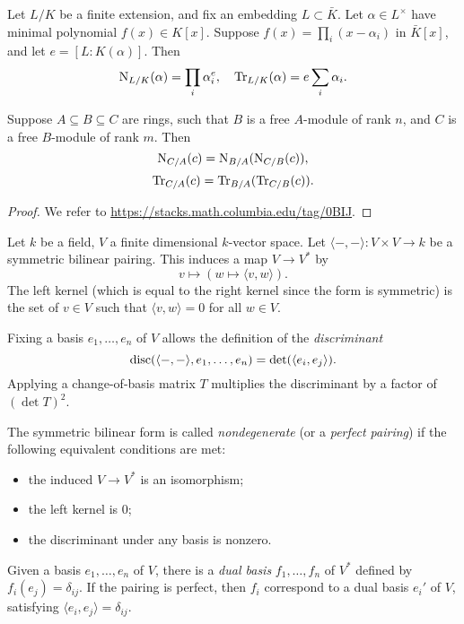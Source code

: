 \documentclass[11pt]{amsart}
\begin{document}
\begin{prop}
Let $L/K$ be a finite extension, and fix an embedding $L\subset \bar{K}$. Let $\alpha\in L^{\times}$ have minimal polynomial $f(x)\in K[x]$. Suppose $f(x) = \prod_i (x-\alpha_i)$ in $\bar{K}[x]$, and let $e = [L:K(\alpha)]$. Then
\[\operatorname{N}_{L/K}(\alpha) = \prod_i \alpha_i^e,\quad \operatorname{Tr}_{L/K}(\alpha) = e\sum_i \alpha_i.\]
\end{prop}

\begin{thm}
Suppose $A\subseteq B \subseteq C$ are rings, such that $B$ is a free $A$-module of rank $n$, and $C$ is a free $B$-module of rank $m$. Then
\[\operatorname{N}_{C/A}(c) = \operatorname{N}_{B/A}(\operatorname{N}_{C/B}(c)),\]
\[\operatorname{Tr}_{C/A}(c) = \operatorname{Tr}_{B/A}(\operatorname{Tr}_{C/B}(c)).\]
\end{thm}

\begin{proof}
We refer to \url{https://stacks.math.columbia.edu/tag/0BIJ}.
\end{proof}

Let $k$ be a field, $V$ a finite dimensional $k$-vector space. Let $\langle-,-\rangle: V\times V\to k$ be a symmetric bilinear pairing. This induces a map $V\to V^{*}$ by
\[v \longmapsto (w\mapsto \langle v, w\rangle).\]
The left kernel (which is equal to the right kernel since the form is symmetric) is the set of $v\in V$ such that $\langle v, w\rangle = 0$ for all $w\in V$.

Fixing a basis $e_1,\dots,e_n$ of $V$ allows the definition of the \emph{discriminant}
\[\operatorname{disc}(\langle-,-\rangle, e_1,\dots,e_n) = \det(\langle e_i, e_j\rangle).\]
Applying a change-of-basis matrix $T$ multiplies the discriminant by a factor of $(\det T)^2$.

The symmetric bilinear form is called \emph{nondegenerate} (or a \emph{perfect pairing}) if the following equivalent conditions are met:
\begin{itemize}
    \item the induced $V\to V^*$ is an isomorphism;
    \item the left kernel is 0;
    \item the discriminant under any basis is nonzero.
\end{itemize}
Given a basis $e_1,\dots,e_n$ of $V$, there is a \emph{dual basis} $f_1,\dots,f_n$ of $V^*$ defined by $f_i(e_j) = \delta_{ij}$. If the pairing is perfect, then $f_i$ correspond to a dual basis $e_i'$ of $V$, satisfying $\langle e_i, e_j\rangle = \delta_{ij}$.
\end{document}
